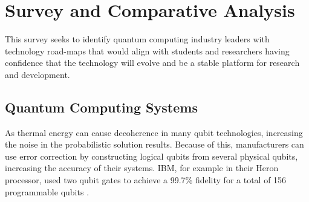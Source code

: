 \section{Survey and Comparative Analysis}

This survey seeks to identify quantum computing industry leaders with technology road-maps that would align with students
and researchers having confidence that the technology will evolve and be a stable platform for research and development.

\subsection{Quantum Computing Systems}

As thermal energy can cause decoherence in many qubit technologies, increasing the noise in the probabilistic solution
results.
Because of this, manufacturers can use error correction by constructing logical qubits from several physical qubits,
increasing the accuracy of their systems.
IBM, for example in their Heron processor, used two qubit gates to achieve a 99.7\% fidelity for a total of 156
programmable qubits \cite{IBM:heronr2:2024}.  

